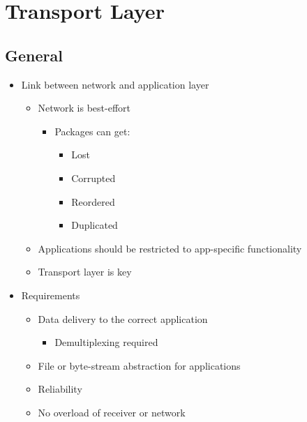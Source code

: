 
\section{Transport Layer}
\subsection{General}
\begin{itemize}
    \item Link between network and application layer
        \begin{itemize}
            \item Network is best-effort
                \begin{itemize}
                    \item Packages can get:
                        \begin{itemize}
                            \item Lost
                            \item Corrupted
                            \item Reordered
                            \item Duplicated
                        \end{itemize}
                \end{itemize}
            \item Applications should be restricted to app-specific functionality
            \item Transport layer is key
        \end{itemize}
    \item Requirements
        \begin{itemize}
            \item Data delivery to the correct application
                \begin{itemize}
                    \item Demultiplexing required
                \end{itemize}
            \item File or byte-stream abstraction for applications
            \item Reliability
            \item No overload of receiver or network
        \end{itemize}
\end{itemize}

